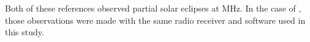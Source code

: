 Both of these references observed partial solar eclipses at \unit[1420]{MHz}. In the case of \cite{leung_solar_2022}, those observations were made with the same radio receiver and software used in this study.
